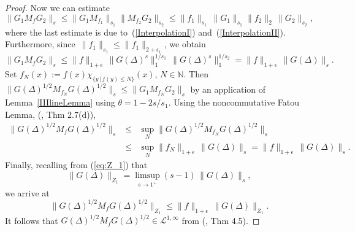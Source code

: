 \documentclass[final,1p]{elsarticle}
\numberwithin{equation}{section}
\theoremstyle{plain}
\theoremstyle{definition}
\begin{document}
\begin{proof}
  Now we can estimate $$ \| G_1 M_f G_2 \|_s \leq \| G_1
    M_{f_1} \|_{s_1} \| M_{f_2} G_2 \|_{s_2} \leq
  \| f_1 \|_{s_1} \, \| G_1 \|_{s_1}
  \| f_2 \|_{2} \, \| G_2 \|_{s_2}, $$ where
  the last estimate is due to~(\ref{InterpolationI})
  and~(\ref{InterpolationII}).  Furthermore, since~$\| f_1
  \|_{s_1} \leq \| f_1 \|_{2 + \epsilon_1}$, we
  obtain $$
\| G_1 M_f G_2 \|_s \leq \| f \|_{1
    + \epsilon} \, \| G(\Delta)^s \|_1^{1/s_1} \, \| G(\Delta)^s
  \|_1^{1 / s_2} = \| f \|_{1 + \epsilon} \, \|
    G(\Delta) \|_s. $$    
Set $f_N(x) := f(x) \chi_{{\ensuremath{\{ {y} \, | \, {f(y) \leq N} \} }}}(x)$, $N \in {\ensuremath{\mathbb{N}}}$.  Then
$\| G(\Delta)^{1/2} M_{f_N} G(\Delta)^{1/2} \|_s \leq \| G_1 M_{f_N} G_2 \|_s$ by an application of Lemma~\ref{IIIlineLemma} using
$\theta = 1 - 2s/s_1$.
Using the noncommutative Fatou Lemma, (\cite{S}, Thm 2.7(d)),
\begin{eqnarray*}
\| G(\Delta)^{1/2} M_{f} G(\Delta)^{1/2} \|_s
& \leq & \sup_N \| G(\Delta)^{1/2} M_{f_N} G(\Delta)^{1/2} \|_s \\
& \leq & \sup_N \| f_N \|_{1 + \epsilon} \, \|G(\Delta) \|_s
    = \| f \|_{1 + \epsilon} \, \|  G(\Delta) \|_s .
\end{eqnarray*}
Finally, recalling from (\ref{eq:Z_1}) that $$\| G(\Delta) \|_{Z_1} = \limsup_{s \to 1^+} (s - 1) \, \| G(\Delta) \|_s, $$ we arrive at
 \begin{equation} \label{eq:epsilonest}
    \|
    G(\Delta)^{1/2} M_f G(\Delta)^{1/2} \|_{Z_1} \leq
    \| f \|_{1 + \epsilon} \, \| G(\Delta)
  \|_{Z_1}.
 \end{equation}
It follows that $G(\Delta)^{1/2} M_f G(\Delta)^{1/2} \in \mathcal{L}^{1,\infty}$
from (\cite{CRSS}, Thm 4.5).


\end{proof}
\end{document}
